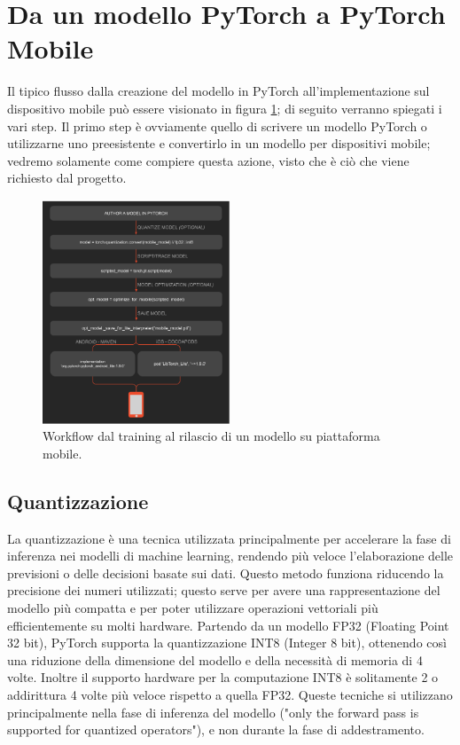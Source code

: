 \section{Da un modello PyTorch a PyTorch Mobile}
Il tipico flusso dalla creazione del modello in PyTorch all'implementazione sul dispositivo mobile può essere visionato in figura \ref{fig:pyworkflow}; di seguito
verranno spiegati i vari step. Il primo step è ovviamente quello di scrivere un modello PyTorch o utilizzarne uno preesistente e convertirlo in un modello per dispositivi mobile; vedremo
solamente come compiere questa azione, visto che è ciò che viene richiesto dal progetto.

\begin{figure}[ht]
    \centering
    \includegraphics[width=0.5\textwidth]{Immagini/workflow_pytorch.png}
    \caption{Workflow dal training al rilascio di un modello su piattaforma mobile.}
    \label{fig:pyworkflow}
\end{figure}

\subsection{Quantizzazione}
La quantizzazione\cite{Quantizzazione} è una tecnica utilizzata principalmente per accelerare la fase di inferenza nei modelli di machine learning,
rendendo più veloce l'elaborazione delle previsioni o delle decisioni basate sui dati. Questo metodo funziona riducendo la precisione dei numeri utilizzati;
questo serve per avere una rappresentazione del modello più compatta e per poter utilizzare operazioni vettoriali più efficientemente su molti hardware.
Partendo da un modello FP32 (Floating Point 32 bit), PyTorch supporta la quantizzazione INT8 (Integer 8 bit), ottenendo così una riduzione della dimensione
del modello e della necessità di memoria di 4 volte. Inoltre il supporto hardware per la computazione INT8 è solitamente 2 o addirittura 4 volte più veloce
rispetto a quella FP32. Queste tecniche si utilizzano principalmente nella fase di inferenza del modello ("only the forward pass is supported for quantized operators"),
e non durante la fase di addestramento.

